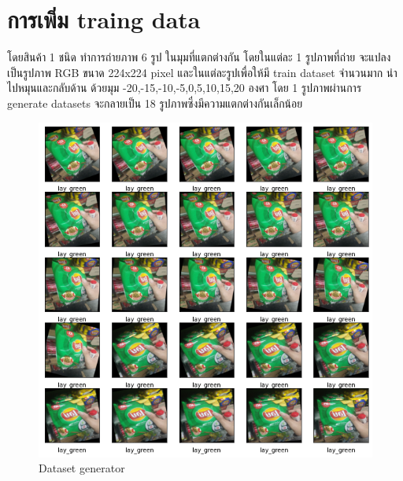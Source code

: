 \section{การเพิ่ม traing data}
โดยสินค้า 1 ชนิด ทำการถ่ายภาพ 6 รูป ในมุมที่แตกต่างกัน 
โดยในแต่ละ 1 รูปภาพที่ถ่าย จะแปลงเป็นรูปภาพ RGB ขนาด 224x224 pixel
และในแต่ละรูปเพื่อให้มี train dataset จำนวนมาก นำไปหมุนและกลับด้าน ด้วยมุม -20,-15,-10,-5,0,5,10,15,20 องศา
โดย 1 รูปภาพผ่านการ generate datasets จะกลายเป็น 18 รูปภาพซึ่งมีความแตกต่างกันเล็กน้อย
\begin{figure}[h]
  \begin{center}
  \includegraphics[scale=0.4]{pic/genmore.png}
  \end{center}
  
  \caption[Dataset generator]{Dataset generator}
  \label{fig:Dataset generator}
  \end{figure}

  \newpage
